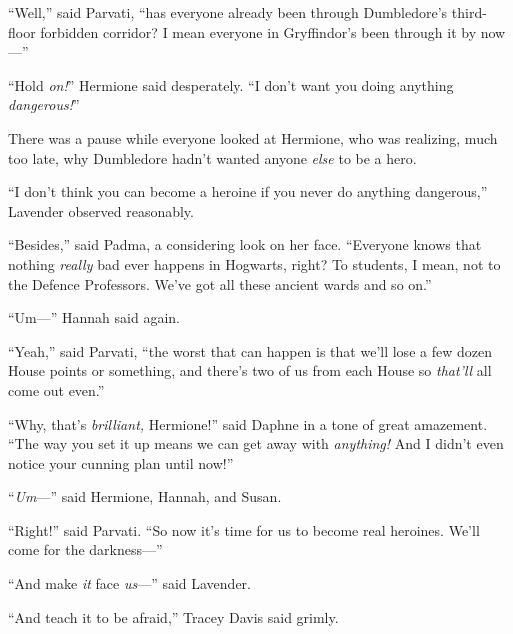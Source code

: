 “Well,” said Parvati, “has everyone already been through Dumbledore’s third-floor forbidden corridor? I mean everyone in Gryffindor’s been through it by now—”

“Hold \emph{on!}” Hermione said desperately. “I don’t want you doing anything \emph{dangerous!}”

There was a pause while everyone looked at Hermione, who was realizing, much too late, why Dumbledore hadn’t wanted anyone \emph{else} to be a hero.

“I don’t think you can become a heroine if you never do anything dangerous,” Lavender observed reasonably.

“Besides,” said Padma, a considering look on her face. “Everyone knows that nothing \emph{really} bad ever happens in Hogwarts, right? To students, I mean, not to the Defence Professors. We’ve got all these ancient wards and so on.”

“Um—” Hannah said again.

“Yeah,” said Parvati, “the worst that can happen is that we’ll lose a few dozen House points or something, and there’s two of us from each House so \emph{that’ll} all come out even.”

“Why, that’s \emph{brilliant,} Hermione!” said Daphne in a tone of great amazement. “The way you set it up means we can get away with \emph{anything!} And I didn’t even notice your cunning plan until now!”

“\emph{Um}—” said Hermione, Hannah, and Susan.

“Right!” said Parvati. “So now it’s time for us to become real heroines. We’ll come for the darkness—”

“And make \emph{it} face \emph{us}—” said Lavender.

“And teach it to be afraid,” Tracey Davis said grimly.

